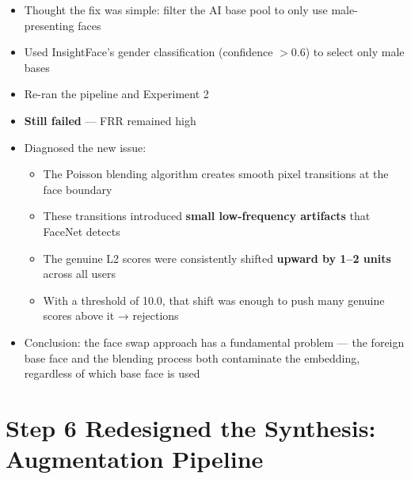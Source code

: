 \documentclass[11pt,a4paper]{article}
\begin{document}
\begin{itemize}
    \item Thought the fix was simple: filter the AI base pool to only use male-presenting faces
    \item Used InsightFace's gender classification (confidence $> 0.6$) to select only male bases
    \item Re-ran the pipeline and Experiment 2
    \item \textbf{Still failed} — FRR remained high
    \item Diagnosed the new issue:
    \begin{itemize}
        \item The Poisson blending algorithm creates smooth pixel transitions at the face boundary
        \item These transitions introduced \textbf{small low-frequency artifacts} that FaceNet detects
        \item The genuine L2 scores were consistently shifted \textbf{upward by 1--2 units} across all users
        \item With a threshold of 10.0, that shift was enough to push many genuine scores above it → rejections
    \end{itemize}
    \item Conclusion: the face swap approach has a fundamental problem — the foreign base face and the blending process both contaminate the embedding, regardless of which base face is used
\end{itemize}

\section*{Step 6 \quad Redesigned the Synthesis: Augmentation Pipeline}
\end{document}
